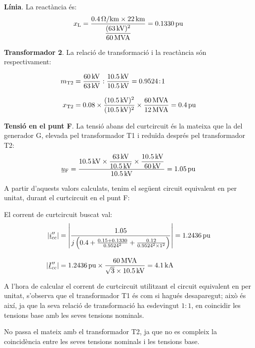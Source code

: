 \begin{exemple}[\MetodeCalculPU{}]
    \textbf{Línia}. La reactància és:
    \[
    x_\mathrm{L} = \frac{\qty{0,4}{\ohm/km} \times \qty{22}{km}} {\dfrac{(\qty{63}{kV})^2}{\qty{60}{MVA}}}  =
    \qty{0,1330}{pu}
    \]

    \textbf{Transformador 2}. La relació de transformació i la reactància són respectivament:

    \begin{align*}
    m_\mathrm{T2} &= \frac{\qty{60}{kV}}{\qty{63}{kV}} :
    \frac{\qty{10,5}{kV}}{\qty{10,5}{kV}} = \num{0,9524}\!:\!1 \\[3mm]
    x_\mathrm{T2} &= \num{0,08} \times \frac{(\qty{10,5}{kV})^2}{(\qty{10,5}{kV})^2} \times
    \frac{\qty{60}{MVA}}{\qty{12}{MVA}}  = \qty{0,4}{pu}
    \end{align*}

    \textbf{Tensió en el punt F}. La tensió abans del curtcircuit és la mateixa que la del generador G, elevada pel transformador T1 i reduïda després pel transformador T2:
    \[
    \cmplx{u}\ped{F} = \frac{\qty{10,5}{kV} \times
    \dfrac{\qty{63}{kV}}{\qty{10,5}{kV}} \times
    \dfrac{\qty{10,5}{kV}}{\qty{60}{kV}}}{\qty{10,5}{kV}} = \qty{1,05}{pu}
    \]

    A partir d'aquests valors calculats, tenim el següent circuit equivalent en per unitat, durant el
    curtcircuit en el punt F:

    \begin{center}
       
    \end{center}

    El corrent de curtcircuit buscat val:
    \begin{align*}
    |\cmplx{i}''\ped{cc}| &= \left| \frac{\num{1,05}}{j \left( \num{0,4} + \frac{\num{0,15} + \num{0,1330}}{\num{0,9524}^2} + \frac{\num{0,12}}{\num{0,9524}^2 \times 1^2} \right)} \right| =
     \qty{1,2436}{pu} \\[3mm]
     |\cmplx{I}''\ped{cc}| &= \qty{1,2436}{pu}\times\frac{\qty{60}{MVA}}{\sqrt{3}\times \qty{10,5}{kV}} =
     \qty{4,1}{kA}
    \end{align*}

     A l'hora de calcular el corrent de curtcircuit utilitzant el circuit equivalent en per unitat,
     s'observa que el transformador T1 és com si hagués desaparegut;
     això és així, ja que la seva relació de transformació ha esdevingut
     $1\!:\!1$, en coincidir les tensions base amb les seves tensions nominals.

     No passa el mateix amb el transformador T2, ja que no es compleix
     la coincidència entre les seves tensions nominals i les tensions
     base.


\end{exemple}
